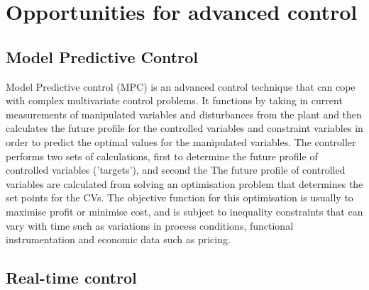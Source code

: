 \section{Opportunities for advanced control}

\subsection{Model Predictive Control}
Model Predictive control (MPC) is an advanced control technique that can cope with complex multivariate control problems. It functions by taking in current measurements of manipulated variables and disturbances from the plant and then calculates the future profile for the controlled variables and constraint variables in order to predict the optimal values for the manipulated variables. The controller performs two sets of calculations, first to determine the future profile of controlled variables ('targets'), and second the  The future profile of controlled variables are calculated from solving an optimisation problem that determines the set points for the CVs. The objective function for this optimisation is usually to maximise profit or minimise cost, and is subject to inequality constraints that can vary with time such as variations in process conditions, functional instrumentation and economic data such as pricing. 

\subsection{Real-time control}